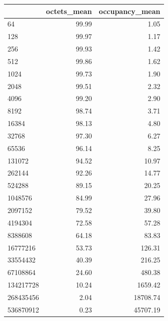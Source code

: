 \begin{tabular}{lrr}
\toprule
 & octets_mean & occupancy_mean \\
\midrule
64 & 99.99 & 1.05 \\
128 & 99.97 & 1.17 \\
256 & 99.93 & 1.42 \\
512 & 99.86 & 1.62 \\
1024 & 99.73 & 1.90 \\
2048 & 99.51 & 2.32 \\
4096 & 99.20 & 2.90 \\
8192 & 98.74 & 3.71 \\
16384 & 98.13 & 4.80 \\
32768 & 97.30 & 6.27 \\
65536 & 96.14 & 8.25 \\
131072 & 94.52 & 10.97 \\
262144 & 92.26 & 14.77 \\
524288 & 89.15 & 20.25 \\
1048576 & 84.99 & 27.96 \\
2097152 & 79.52 & 39.80 \\
4194304 & 72.58 & 57.28 \\
8388608 & 64.18 & 83.83 \\
16777216 & 53.73 & 126.31 \\
33554432 & 40.39 & 216.25 \\
67108864 & 24.60 & 480.38 \\
134217728 & 10.24 & 1659.42 \\
268435456 & 2.04 & 18708.74 \\
536870912 & 0.23 & 45707.19 \\
\bottomrule
\end{tabular}
